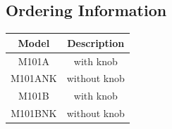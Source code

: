 \documentclass[a4paper, final, 12pt, oneside]{scrartcl}
\numberwithin{equation}{section}
\numberwithin{table}{section}
\numberwithin{figure}{section}
\begin{document}
\subsection*{Ordering Information}
\begin{tabular}{c|c}
  \hline
  \textbf{Model} & \textbf{Description} \\
  \hline
  M101A   & with knob \\
  M101ANK & without knob \\
  M101B   & with knob \\
  M101BNK & without knob \\
  \hline 
\end{tabular}




\vfill
\end{document}
